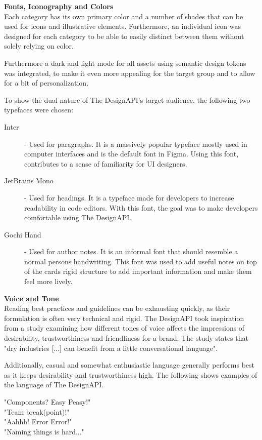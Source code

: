 \textbf{Fonts, Iconography and Colors}\\
Each category has its own primary color and a number of shades that can be used for icons and
illustrative elements. Furthermore, an individual icon was designed for each category to be able to
easily distinct between them without solely relying on color.

Furthermore a dark and light mode for all assets using semantic design tokens was integrated, to
make it even more appealing for the target group and to allow for a bit of personalization.

To show the dual nature of The DesignAPI's target audience, the following two typefaces were chosen:
\begin{description}
      \item[Inter] - Used for paragraphs. It is a massively popular typeface mostly used in
            computer interfaces and is the default font in Figma. Using this font, contributes to a
            sense of familiarity for UI designers. 

      \item[JetBrains Mono] - Used for headings. It is a typeface made for developers to increase
            readability in code editors. With this font, the goal was to make developers comfortable
            using The DesignAPI. 

      \item[Gochi Hand] - Used for author notes. It is an informal font that should resemble a normal
            persons handwriting. This font was used to add useful notes on top of the cards rigid structure
            to add important information and make them feel more lively.
\end{description}


\textbf{Voice and Tone}\\
Reading best practices and guidelines can be exhausting quickly, as their formulation is often very
technical and rigid. The DesignAPI took inspiration from a study examining how different tones of
voice affects the impressions of desirability, trustworthiness and friendliness for a brand.
The study states that "dry industries [...] can benefit from a little conversational language".

Additionally, casual and somewhat enthusiastic language generally performs best as it keeps
desirability and trustworthiness high. 
The following shows examples of the language of The DesignAPI.

"Components? Easy Peasy!"\\
"Team break(point)!"\\
"Aahhh! Error Error!"\\
"Naming things is hard..."\\
